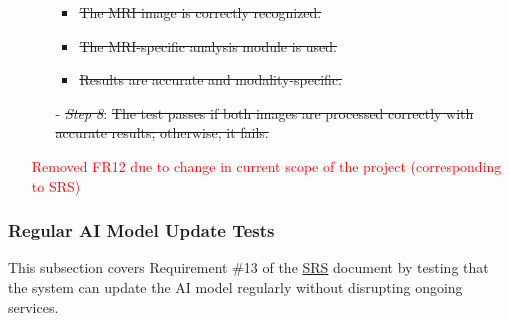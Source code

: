 \documentclass[12pt, titlepage]{article}
\begin{document}
\begin{enumerate}
\begin{itemize}
    \begin{itemize}
      \item \sout{The MRI image is correctly recognized.}
      \item \sout{The MRI-specific analysis module is used.}
      \item \sout{Results are accurate and modality-specific.}
    \end{itemize}
  \item[-] \textit{\sout{Step 8}}: \sout{The test passes if both images are processed correctly with accurate results; otherwise, it fails.}
\end{itemize}

\textcolor{red}{Removed FR12 due to change in current scope of the project (corresponding to SRS)}

\end{enumerate}

\subsubsection{Regular AI Model Update Tests}

This subsection covers Requirement \#13 of the 
\href{https://github.com/RezaJodeiri/CXR-Capstone/blob/main/docs/SRS/SRS.pdf}{SRS} 
\citep{SRS} document by testing that the system can update the AI model regularly without disrupting ongoing services.
\end{document}
